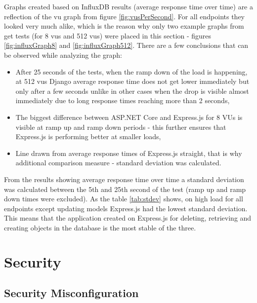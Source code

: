 Graphs created based on InfluxDB results (average response time over time) are a reflection of the \acrshort{vu} graph from figure \ref{fig:vusPerSecond}. For all endpoints they looked very much alike, which is the reason why only two example graphs from get tests (for 8 \acrshort{vu}s and 512 \acrshort{vu}s) were placed in this section - figures \ref{fig:influxGraph8} and \ref{fig:influxGraph512}. There are a few conclusions that can be observed while analyzing the graph:
\begin{itemize}
      \item After 25 seconds of the tests, when the ramp down of the load is happening, at 512 \acrshort{vu}s Django average response time does not get lower immediately but only after a few seconds unlike in other cases when the drop is visible almost immediately due to long response times reaching more than 2 seconds,
      \item The biggest difference between ASP.NET Core and Express.js for 8 VUs is visible at ramp up and ramp down periods - this further ensures that Express.js is performing better at smaller loads,
      \item Line drawn from average response times of Express.js straight, that is why additional comparison measure - standard deviation was calculated.

\end{itemize}



From the results showing average response time over time a standard deviation was calculated between the 5th and 25th second of the test (ramp up and ramp down times were excluded). As the table \ref{tab:stdev} shows, on high load for all endpoints except updating models Express.js had the lowest standard deviation. This means that the application created on Express.js for deleting, retrieving and creating objects in the database is the most stable of the three.



\section{Security}
\subsection{Security Misconfiguration}
